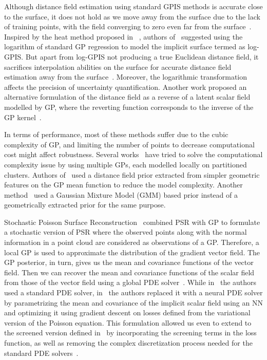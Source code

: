 Although distance field estimation using standard GPIS methods is accurate close to the surface, it does not hold as we move away from the surface due to the lack of training points, with the field converging to zero even far from the surface~\cite{logGPIS}. Inspired by the heat method proposed in ~\cite{GeodesicHeat}, authors of~\cite{logGPIS} suggested using the logarithm of standard GP regression to model the implicit surface termed as log-GPIS. But apart from log-GPIS not producing a true Euclidean distance field, it sacrifices interpolation abilities on the surface for accurate distance field estimation away from the surface~\cite{onlinePriorGPIS}. Moreover, the logarithmic transformation affects the precision of uncertainty quantification. Another work proposed an alternative formulation of the distance field as a reverse of a latent scalar field modelled by GP, where the reverting function corresponds to the inverse of the GP kernel~\cite{GPDF}.
\newline

In terms of performance, most of these methods suffer due to the cubic complexity of GP, and limiting the number of points to decrease computational cost might affect robustness. Several works~\cite{mixGPOccMap, locGPOccMap, onlineGPIS} have tried to solve the computational complexity issue by using multiple GPs, each modelled locally on partitioned clusters. Authors of~\cite{onlinePriorGPIS} used a distance field prior extracted from simpler geometric features on the GP mean function to reduce the model complexity. Another method~\cite{GMMGP} used a Gaussian Mixture Model (GMM) based prior instead of a geometrically extracted prior for the same purpose.
\newline

Stochastic Poisson Surface Reconstruction~\cite{SPSR} combined PSR with GP to formulate a stochastic version of PSR where the observed points along with the normal information in a point cloud are considered as observations of a GP. Therefore, a local GP is used to approximate the distribution of the gradient vector field. The GP posterior, in turn, gives us the mean and covariance functions of the vector field. Then we can recover the mean and covariance functions of the scalar field from those of the vector field using a global PDE solver~\cite{SPSR}. While in~\cite{SPSR} the authors used a standard PDE solver, in~\cite{NeuralSPSR} the authors replaced it with a neural PDE solver by parametrizing the mean and covariance of the implicit scalar field using an NN and optimizing it using gradient descent on losses defined from the variational version of the Poisson equation. This formulation allowed us even to extend to the screened version defined in~\cite{ScreenedPSR} by incorporating the screening terms in the loss function, as well as removing the complex discretization process needed for the standard PDE solvers~\cite{NeuralSPSR}. 

